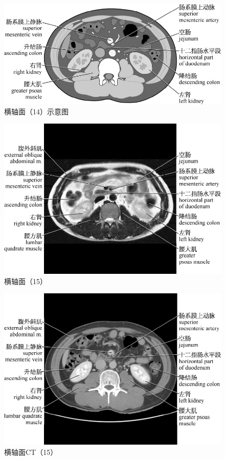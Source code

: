\begin{figure}[!htbp]
 \centering
 \includegraphics{./images/Image00043.jpg}
 \captionsetup{justification=centering}
 \caption{横轴面（14）示意图}
  \end{figure} 
 \FloatBarrier

\begin{figure}[!htbp]
 \centering
 \includegraphics{./images/Image00044.jpg}
 \captionsetup{justification=centering}
 \caption{横轴面（15）}
  \end{figure} 
 \FloatBarrier

\begin{figure}[!htbp]
 \centering
 \includegraphics{./images/Image00045.jpg}
 \captionsetup{justification=centering}
 \caption{横轴面CT（15）}
  \end{figure} 
 \FloatBarrier

